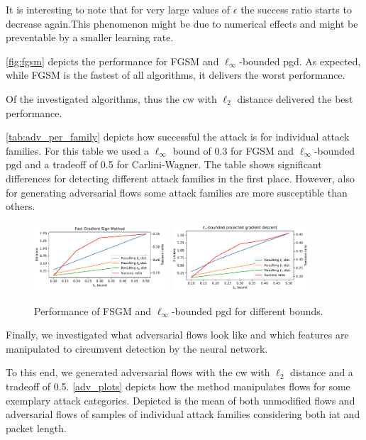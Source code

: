 \documentclass[conference]{IEEEtran}
\begin{document}
It is interesting to note that for very large values of $\epsilon$ the success ratio starts to decrease again.This phenomenon might be due to numerical effects and might be preventable by a smaller learning rate.


\autoref{fig:fgsm} depicts the performance for FGSM and $\ell_\infty$-bounded \gls{pgd}. As expected, while FGSM is the fastest of all algorithms, it delivers the worst performance.

Of the investigated algorithms, thus the \gls{cw} with $\ell_2$ distance delivered the best performance.

\autoref{tab:adv_per_family} depicts how successful the attack is for individual attack families. For this table we used a $\ell_\infty$ bound of 0.3 for FGSM and $\ell_\infty$-bounded \gls{pgd} and a tradeoff of 0.5 for Carlini-Wagner. The table shows significant differences for detecting different attack families in the first place. However, also for generating adversarial flows some attack families are more susceptible than others.

\begin{figure}
\includegraphics[width=0.45\textwidth]{adv_plots/fgsm.pdf}
\includegraphics[width=0.45\textwidth]{adv_plots/l_inf_pgd.pdf}
\caption{Performance of FSGM and $\ell_\infty$-bounded \gls{pgd} for different bounds.}
\label{fig:fgsm}
\end{figure}

Finally, we investigated what adversarial flows look like and which features are manipulated to circumvent detection by the neural network.

To this end, we generated adversarial flows with the \gls{cw} with $\ell_2$ distance and a tradeoff of 0.5. \autoref{adv_plots} depicts how the method manipulates flows for some exemplary attack categories. Depicted is the mean of both unmodified flows and adversarial flows  of samples of individual attack families considering both \gls{iat} and packet length.
\end{document}
